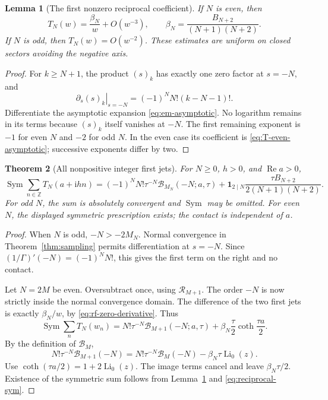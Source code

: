 \documentclass[11pt,a4paper]{article}
\numberwithin{equation}{section}
\newtheorem{theorem}{Theorem}[section]
\newtheorem{lemma}[theorem]{Lemma}
\theoremstyle{definition}
\theoremstyle{remark}
\DeclareMathOperator{\Li}{Li}
\DeclareMathOperator{\Ree}{Re}
\DeclareMathOperator{\Sym}{Sym}
\newcommand{\ii}{\mathrm i}
\newcommand{\Z}{\mathbb Z}
\newcommand{\Rcal}{\mathcal R}
\newcommand{\Bcal}{\mathcal B}
\begin{document}
\begin{lemma}[The first nonzero reciprocal coefficient]\label{lem:beta}
If $N$ is even, then
\begin{equation}\label{eq:T-even-asymptotic}
 T_N(w)=\frac{\beta_N}{w}+O(w^{-3}),\qquad
 \beta_N=\frac{B_{N+2}}{(N+1)(N+2)}.
\end{equation}
If $N$ is odd, then $T_N(w)=O(w^{-2})$.
These estimates are uniform on closed sectors avoiding the negative axis.
\end{lemma}
\begin{proof}
For $k\ge N+1$, the product $(s)_k$ has exactly one zero factor at
$s=-N$, and
\begin{equation}\label{eq:rf-zero-derivative}
 \left.\partial_s(s)_k\right|_{s=-N}
       =(-1)^N N!(k-N-1)!.
\end{equation}
Differentiate the asymptotic expansion
\eqref{eq:em-asymptotic}. No logarithm remains in its terms because
$(s)_k$ itself vanishes at $-N$. The first remaining exponent is
$-1$ for even $N$ and $-2$ for odd $N$. In the even case its
coefficient is \eqref{eq:T-even-asymptotic}; successive exponents
differ by two.
\end{proof}

\begin{theorem}[All nonpositive integer first jets]\label{thm:negative}
For $N\ge0$, $h>0$, and $\Ree a>0$,
\begin{equation}\label{eq:negative-main}
 \boxed{\displaystyle
 \Sym\sum_{n\in\Z}T_N(a+\ii hn)
 =(-1)^N N!\tau^{-N}\Bcal_{M_N}(-N;a,\tau)
 +\mathbf1_{2\mid N}\frac{\tau B_{N+2}}{2(N+1)(N+2)}.}
\end{equation}
For odd $N$, the sum is absolutely convergent and $\Sym$ may be
omitted. For even $N$, the displayed symmetric prescription exists;
the contact is independent of $a$.
\end{theorem}
\begin{proof}
When $N$ is odd, $-N>-2M_N$. Normal convergence in
Theorem~\ref{thm:sampling} permits differentiation at $s=-N$.
Since $(1/\Gamma)'(-N)=(-1)^N N!$, this gives the first term on
the right and no contact.

Let $N=2M$ be even. Oversubtract once, using $\Rcal_{M+1}$.
The order $-N$ is now strictly inside the normal convergence domain.
The difference of the two first jets is exactly $\beta_N/w$, by
\eqref{eq:rf-zero-derivative}. Thus
\[
 \Sym\sum_n T_N(w_n)
 =N!\tau^{-N}\Bcal_{M+1}(-N;a,\tau)
        +\beta_N\frac\tau2\coth\frac{\tau a}{2}.
\]
By the definition of $\Bcal_M$,
\[
 N!\tau^{-N}\Bcal_{M+1}(-N)
 =N!\tau^{-N}\Bcal_M(-N)-\beta_N\tau\Li_0(z).
\]
Use $\coth(\tau a/2)=1+2\Li_0(z)$. The image terms cancel and
leave $\beta_N\tau/2$. Existence of the symmetric sum follows
from Lemma~\ref{lem:beta} and \eqref{eq:reciprocal-sym}.
\end{proof}
\end{document}
